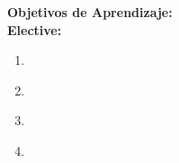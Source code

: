 \noindent \textbf{Objetivos de Aprendizaje:}\\
\noindent \textbf{Elective:}
\begin{enumerate}
	\setcounter{enumi}{0}
	\item \CNNumericalAnalysisLODefineError\xspace[\CNNumericalAnalysisLODefineErrorLevel]\label{sec:BOK:CNNumericalAnalysisLODefineError}
	\item \CNNumericalAnalysisLOImplementTaylor\xspace[\CNNumericalAnalysisLOImplementTaylorLevel]\label{sec:BOK:CNNumericalAnalysisLOImplementTaylor}
	\item \CNNumericalAnalysisLOImplementAlgorithms\xspace[\CNNumericalAnalysisLOImplementAlgorithmsLevel]\label{sec:BOK:CNNumericalAnalysisLOImplementAlgorithms}
	\item \CNNumericalAnalysisLOImplementAlgorithmsDifferential\xspace[\CNNumericalAnalysisLOImplementAlgorithmsDifferentialLevel]\label{sec:BOK:CNNumericalAnalysisLOImplementAlgorithmsDifferential}
\end{enumerate}



